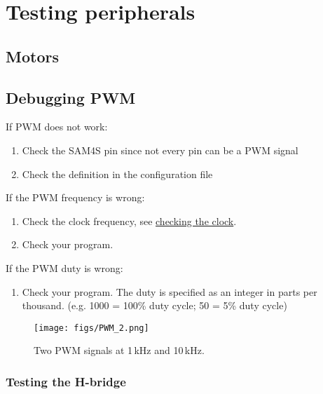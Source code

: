 \section{Testing peripherals}
\label{testing-peripherals}

 
\subsection{Motors}
 
\subsection{Debugging PWM}
\label{debugging-pwm}

If PWM does not work:

\begin{enumerate}
\item
  Check the SAM4S pin since not every pin can be a PWM signal
\item
  Check the definition in the configuration file 
\end{enumerate}

If the PWM frequency is wrong:

\begin{enumerate}
\item
  Check the clock frequency, see
  \hyperref[checking-the-clock]{checking the clock}.
\item
  Check your program.
\end{enumerate}

If the PWM duty is wrong:

\begin{enumerate}
\item
  Check your program. The duty is specified as an integer in parts per
  thousand. (e.g. 1000 = 100\% duty cycle; 50 = 5\% duty cycle)
\end{enumerate}

\begin{figure}
\centering
\texttt{[image: figs/PWM\_2.png]}
\caption{Two PWM signals at 1\,kHz and 10\,kHz.}
\end{figure}


\subsubsection{Testing the H-bridge}
\label{testing-the-h-bridge}

